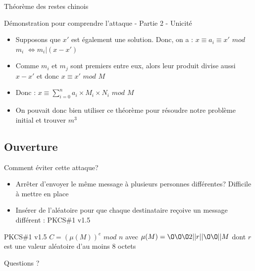 \documentclass{beamer}
\begin{document}
	\begin{frame}{Théorème des restes chinois}
	\begin{alertblock}{Démonstration pour comprendre l'attaque - Partie 2 - Unicité}
	\begin{itemize}
		\item Supposons que $x'$ est également une solution.
		Donc, on a : \newline $x \equiv a_i \equiv x'$ $mod$ $m_i$
		$\Leftrightarrow m_i | (x-x')$
		\item Comme $m_i$ et $m_j$ sont premiers entre eux, alors leur produit divise aussi $x - x'$ et donc $x \equiv x'$ $mod$ $M$
		\item Donc : $x \equiv \sum \limits_{i=0}^{n}a_i \times M_i \times N_i$ $mod$ $M$
		\item On pouvait donc bien utiliser ce théorème pour résoudre notre problème initial et trouver $m^3$
	\end{itemize}
	\end{alertblock}
	\end{frame}

	\subsection{Ouverture}

	\begin{frame}
	\begin{block}{Comment éviter cette attaque?}
		\begin{itemize}
			\item Arrêter d'envoyer le même message à plusieurs personnes différentes? Difficile à mettre en place
			\item Insérer de l'aléatoire pour que chaque destinataire reçoive un message différent : PKCS\#1 v1.5
		\end{itemize}
	\end{block}
	\begin{exampleblock}{PKCS\#1 v1.5}
	$C=(\mu(M))^e$ $mod$ $n$ avec
	$\mu(M)=\O\O\O2||r||\O\O||M$ \newline dont $r$ est une valeur aléatoire d'au moins 8 octets
	\end{exampleblock}
	\end{frame}


	\begin{frame}
	\begin{center}
		Questions ? 
	\end{center}
	\end{frame}

    
\end{document}

